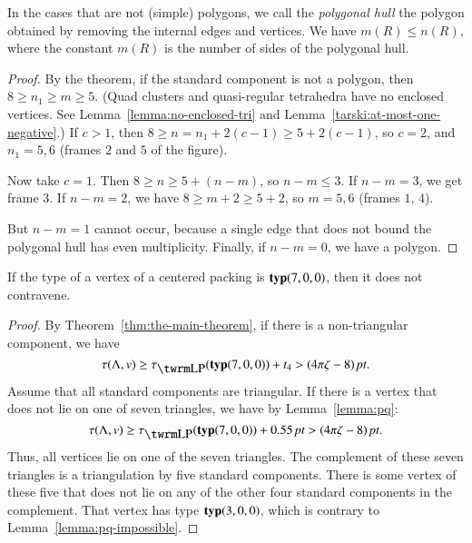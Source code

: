In the cases that are not (simple) polygons, we call the {\it polygonal
hull\/} the polygon obtained by removing the internal edges and
vertices. We have $m(R)\le n(R)$, where the constant $m(R)$ is the
number of sides of the polygonal hull.

\begin{proof}
By the theorem, if the standard component is not a polygon, then $8\ge
n_1\ge m\ge 5$. (Quad clusters and quasi-regular tetrahedra have no
enclosed vertices. See Lemma~\ref{lemma:no-enclosed-tri} and
Lemma~\ref{tarski:at-most-one-negative}.) If $c>1$, then $8\ge
n=n_1+2(c-1)\ge 5+2(c-1)$, so $c=2$, and $n_1=5,6$ (frames $2$ and $5$
of the figure).

Now take $c=1$.    Then $8\ge n\ge 5+(n-m)$, so $n-m\le 3$.  If $n-m=3$,
we get frame $3$. If $n-m=2$, we have $8\ge m+2\ge 5+2$, so $m=5,6$
(frames $1$, $4$).

But $n-m=1$ cannot occur, because a single edge that does not bound the
polygonal hull has even multiplicity.  Finally, if $n-m=0$, we have a
polygon.
\end{proof}

\begin{corollary} \label{lemma:70}
If the type of a vertex of a centered packing is ${\operatorname{\bf typ}}{(7,0,0)}$, then it
does not contravene.
\end{corollary}

\begin{proof} By Theorem~\ref{thm:the-main-theorem},
if there is a non-triangular component, we have
    $$\tau(\Lambda,v)\ge\tlp(\pqr{(7,0,0)})+t_4>\squander.$$
Assume that all standard components are triangular.  If there is a
vertex that does not lie on one of seven triangles, we have by
Lemma~\ref{lemma:pq}:
    $$\tau(\Lambda,v)\ge\tlp(\pqr{(7,0,0)})+0.55\,\pt>\squander.$$
Thus, all vertices lie on one of the seven triangles.  The
complement of these seven triangles is a  triangulation by
five standard components.  There is some vertex of these five that does
not lie on any of the other four standard components in the complement.
That vertex has type ${\operatorname{\bf typ}}{(3,0,0)}$, which is contrary to
Lemma~\ref{lemma:pq-impossible}.
\end{proof}



